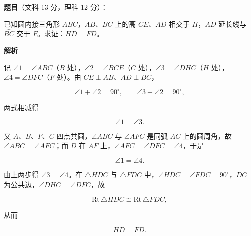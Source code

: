 \begin{answer}

\textbf{题目}（文科 13 分，理科 12 分）：

已知圆内接三角形 $ABC$，$AB$、$BC$ 上的高 $CE$、$AD$ 相交于 $H$，$AD$ 延长线与 $\overset{\frown}{BC}$ 交于 $F$。求证：$HD=FD$。
\nopagebreak[4]
\begin{center}\end{center}
\nopagebreak[4]
\textbf{解析}
\nopagebreak[4]
\begin{center}\end{center}
\nopagebreak[4]
记 $\angle1=\angle ABC$（$B$ 处），$\angle2=\angle BCE$（$C$ 处），$\angle3=\angle DHC$（$H$ 处），$\angle4=\angle DFC$（$F$ 处）。由 $CE\perp AB$、$AD\perp BC$，

\nopagebreak[4]
\[
\angle1+\angle2=90^\circ,
\qquad
\angle3+\angle2=90^\circ,
\]

两式相减得

\nopagebreak[4]
\[
\angle1=\angle3.
\]

又 $A$、$B$、$F$、$C$ 四点共圆，$\angle ABC$ 与 $\angle AFC$ 是同弧 $AC$ 上的圆周角，故 $\angle ABC=\angle AFC$；而 $D$ 在 $AF$ 上，$\angle AFC=\angle DFC=\angle4$，于是

\nopagebreak[4]
\[
\angle1=\angle4.
\]

由上两步得 $\angle3=\angle4$。在 $\triangle HDC$ 与 $\triangle FDC$ 中，$\angle HDC=\angle FDC=90^\circ$，$DC$ 为公共边，$\angle DHC=\angle DFC$，故

\nopagebreak[4]
\[
\mathrm{Rt}\,\triangle HDC\cong\mathrm{Rt}\,\triangle FDC,
\]

从而

\nopagebreak[4]
\[
HD=FD.
\]


\end{answer}

